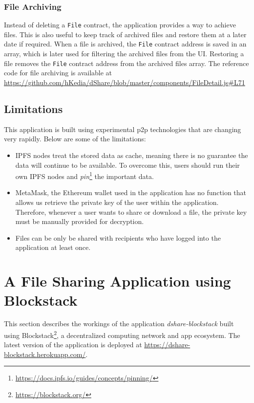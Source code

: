 \subsubsection{File Archiving}
Instead of deleting a \texttt{File} contract, the application provides a way to achieve files. This is also useful to keep track of archived files and restore them at a later date if required. When a file is archived, the \texttt{File} contract address is saved in an array, which is later used for filtering the archived files from the UI. Restoring a file removes the \texttt{File} contract address from the archived files array. The reference code for file archiving is available at \url{https://github.com/hKedia/dShare/blob/master/components/FileDetail.js#L71}

\subsection{Limitations}
This application is built using experimental p2p technologies that are changing very rapidly. Below are some of the limitations:

\begin{itemize}
	\item IPFS nodes treat the stored data as cache, meaning there is no guarantee the data will continue to be available. To overcome this, users should run their own IPFS nodes and \textit{pin}\footnote{\url{https://docs.ipfs.io/guides/concepts/pinning/}} the important data.
	
	\item MetaMask, the Ethereum wallet used in the application has no function that allows us retrieve the private key of the user within the application. Therefore, whenever a user wants to share or download a file, the private key must be manually provided for decryption.
	
	\item Files can be only be shared with recipients who have logged into the application at least once.
\end{itemize}

\section{A File Sharing Application using Blockstack}
This section describes the workings of the application \textit{dshare-blockstack}\cite{harsh_kedia_2019_3359854} built using Blockstack\footnote{\url{https://blockstack.org/}}, a decentralized computing network and app ecosystem. The latest version of the application is deployed at \url{https://dshare-blockstack.herokuapp.com/}.

